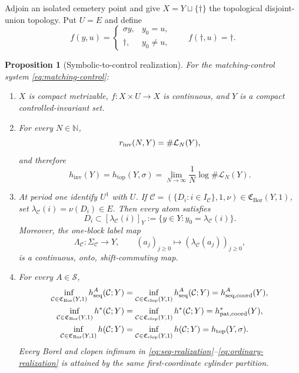 \documentclass[11pt,reqno]{amsart}
\numberwithin{equation}{section}
\newtheorem{proposition}[theorem]{Proposition}
\theoremstyle{definition}
\theoremstyle{definition}
\newcommand{\N}{\mathbb N}
\newcommand{\C}{\mathcal C}
\newcommand{\Lcal}{\mathcal L}
\newcommand{\hseq}{h_{\mathrm{seq}}}
\newcommand{\hpat}{h^{*}}
\newcommand{\hinv}{h_{\mathrm{inv}}}
\newcommand{\htop}{h_{\mathrm{top}}}
\newcommand{\Bor}{\mathrm{Bor}}
\newcommand{\clop}{\mathrm{clop}}
\begin{document}
Adjoin an isolated cemetery point and give
$X=Y\sqcup\{\dagger\}$ the topological disjoint-union topology.  Put $U=E$
and define
\begin{equation}\label{eq:matching-control}
 f(y,u)=
 \begin{cases}
   \sigma y,&y_0=u,\\
   \dagger,&y_0\ne u,
 \end{cases}
 \qquad
 f(\dagger,u)=\dagger.
\end{equation}

\begin{proposition}[Symbolic-to-control realization]\label{thm:C}
For the matching-control system \eqref{eq:matching-control}:
\begin{enumerate}
\item $X$ is compact metrizable, $f:X\times U\to X$ is continuous, and $Y$
is a compact controlled-invariant set.
\item For every $N\in\N$,
\begin{equation}\label{eq:rinv-language}
 r_{\rm inv}(N,Y)=\#\Lcal_N(Y),
\end{equation}
and therefore
\begin{equation}\label{eq:hinv-htop}
 \hinv(Y)=\htop(Y,\sigma)
 =\lim_{N\to\infty}\frac1N\log\#\Lcal_N(Y).
\end{equation}
\item At period one identify $U^1$ with $U$.  If
$\C=(\{D_i:i\in I_\C\},1,\nu)\in\mathfrak C_{\Bor}(Y,1)$, set
$\lambda_\C(i)=\nu(D_i)\in E$.  Then every atom satisfies
\begin{equation}\label{eq:atom-cylinder}
 D_i\subset[\lambda_\C(i)]_Y
 :=\{y\in Y:y_0=\lambda_\C(i)\}.
\end{equation}
Moreover, the one-block label map
\begin{equation}\label{eq:label-factor}
 \Lambda_\C:\Sigma_\C\longrightarrow Y,
 \qquad (a_j)_{j\ge0}\longmapsto(\lambda_\C(a_j))_{j\ge0},
\end{equation}
is a continuous, onto, shift-commuting map.
\item For every $A\in\mathscr S$,
\begin{align}
 \inf_{\C\in\mathfrak C_{\Bor}(Y,1)}\hseq^A(\C;Y)
 &=\inf_{\C\in\mathfrak C_{\clop}(Y,1)}\hseq^A(\C;Y)
 =h_{\rm seq,coord}^A(Y),
 \label{eq:seq-realization}\\
 \inf_{\C\in\mathfrak C_{\Bor}(Y,1)}\hpat(\C;Y)
 &=\inf_{\C\in\mathfrak C_{\clop}(Y,1)}\hpat(\C;Y)
 =h_{\rm pat,coord}^*(Y),
 \label{eq:pat-realization}\\
 \inf_{\C\in\mathfrak C_{\Bor}(Y,1)}h(\C;Y)
 &=\inf_{\C\in\mathfrak C_{\clop}(Y,1)}h(\C;Y)
 =\htop(Y,\sigma).
 \label{eq:ordinary-realization}
\end{align}
Every Borel and clopen infimum in
\eqref{eq:seq-realization}--\eqref{eq:ordinary-realization} is attained by
the same first-coordinate cylinder partition.
\end{enumerate}
\end{proposition}
\end{document}
